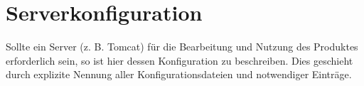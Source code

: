 \chapter{Serverkonfiguration}
Sollte ein Server (z. B. Tomcat) für die Bearbeitung und Nutzung des Produktes
erforderlich sein, so ist hier dessen Konfiguration zu beschreiben. Dies
geschieht durch explizite Nennung aller Konfigurationsdateien und notwendiger
Einträge.

